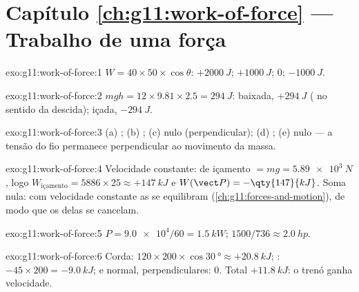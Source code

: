 \section*{Capítulo \ref{ch:g11:work-of-force} --- Trabalho de uma força}

\begin{solution}{exo:g11:work-of-force:1}
$W = 40 \times 50 \times \cos\theta$: $+\qty{2000}{J}$;
$+\qty{1000}{J}$; $0$; $-\qty{1000}{J}$.
\end{solution}

\begin{solution}{exo:g11:work-of-force:2}
$mgh = 12 \times 9.81 \times 2.5 = \qty{294}{J}$: baixada,
$+\qty{294}{J}$ ( no sentido da descida); içada, $-\qty{294}{J}$.
\end{solution}

\begin{solution}{exo:g11:work-of-force:3}
(a) ; (b) ; (c) nulo (perpendicular); (d) ;
(e) nulo --- a tensão do fio permanece perpendicular ao movimento da
massa.
\end{solution}

\begin{solution}{exo:g11:work-of-force:4}
Velocidade constante:  de içamento $= mg = \qty{5.89e3}{N}$, logo
$W_{\text{içamento}} = 5886 \times 25 \approx +\qty{147}{kJ}$ e
$W(\vect P) = -\qty{147}{kJ}$. Soma nula: com velocidade constante as
 se equilibram (\cref{ch:g11:forces-and-motion}), de modo que os
 delas se cancelam.
\end{solution}

\begin{solution}{exo:g11:work-of-force:5}
$P = \num{9.0e4}/60 = \qty{1.5}{kW}$; $1500/736 \approx \qty{2.0}{hp}$.
\end{solution}

\begin{solution}{exo:g11:work-of-force:6}
Corda: $120 \times 200 \times \cos\qty{30}{\degree} \approx
+\qty{20.8}{kJ}$; : $-45 \times 200 = -\qty{9.0}{kJ}$;  e 
normal, perpendiculares: $0$. Total $+\qty{11.8}{kJ}$: o trenó ganha
velocidade.
\end{solution}

